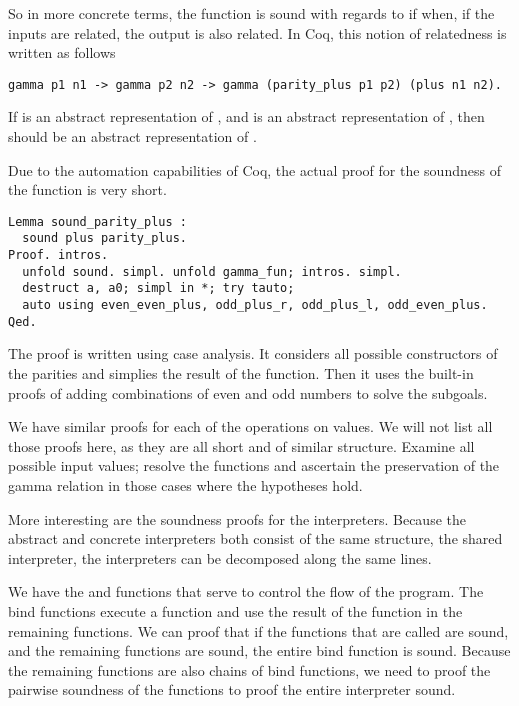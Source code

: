 So in more concrete terms, the function  is sound with 
regards to 
if when, if the inputs are related, the output is also related. In Coq, this 
notion of relatedness is written as follows

\begin{verbatim}
gamma p1 n1 -> gamma p2 n2 -> gamma (parity_plus p1 p2) (plus n1 n2).
\end{verbatim}

If  is an abstract representation of , and  is an 
abstract representation of , then  should be an 
abstract representation of . 

Due to the automation capabilities of Coq, the actual proof for the soundness
of the  function is very short.

\begin{verbatim}
Lemma sound_parity_plus :
  sound plus parity_plus.
Proof. intros.
  unfold sound. simpl. unfold gamma_fun; intros. simpl. 
  destruct a, a0; simpl in *; try tauto;
  auto using even_even_plus, odd_plus_r, odd_plus_l, odd_even_plus.
Qed.
\end{verbatim}

The proof is written using case analysis. It considers all possible
constructors of the parities and simplies the result of the 
function. Then it uses the built-in proofs of adding combinations of even and
odd numbers to solve the subgoals.

We have similar proofs for each of the operations on values. We will not list
all those proofs here, as they are all short and of similar structure. Examine
all possible input values; resolve the functions and ascertain the preservation
of the gamma relation in those cases where the hypotheses hold.

More interesting are the soundness proofs for the interpreters. Because the
abstract and concrete interpreters both consist of the same structure, the
shared interpreter, the interpreters can be decomposed along the same lines.

We have the  and  functions that 
serve to control the flow of the program. The bind functions execute a function
and use the result of the function in the remaining functions. We can proof
that if the functions that are called are sound, and the remaining functions
are sound, the entire bind function is sound. Because the remaining functions
are also chains of bind functions, we need to proof the pairwise soundness of 
the functions to proof the entire interpreter sound.

